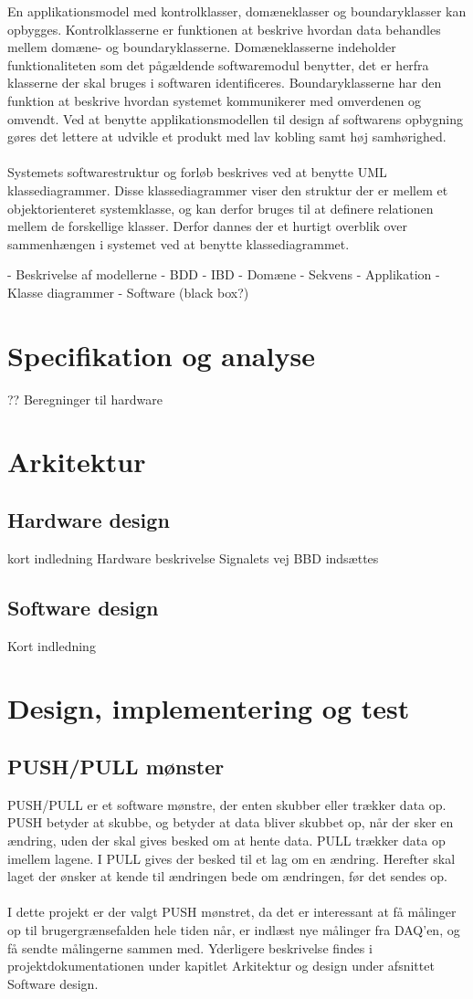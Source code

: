 En applikationsmodel med kontrolklasser, domæneklasser og boundaryklasser kan opbygges. Kontrolklasserne er funktionen at beskrive hvordan data behandles mellem domæne- og boundaryklasserne. Domæneklasserne indeholder funktionaliteten som det pågældende softwaremodul benytter, det er herfra klasserne der skal bruges i softwaren identificeres. Boundaryklasserne har den funktion at beskrive hvordan systemet kommunikerer med omverdenen og omvendt. Ved at benytte applikationsmodellen til design af softwarens opbygning gøres det lettere at udvikle et produkt med lav kobling samt høj samhørighed. \\
\\
Systemets softwarestruktur og forløb beskrives ved at benytte UML klassediagrammer. Disse klassediagrammer viser den struktur der er mellem et objektorienteret systemklasse, og kan derfor bruges til at definere relationen mellem de forskellige klasser. Derfor dannes der et hurtigt overblik over sammenhængen i systemet ved at benytte klassediagrammet.  

- Beskrivelse af modellerne
	- BDD
	- IBD
	- Domæne
	- Sekvens
	- Applikation
	- Klasse diagrammer
	- Software (black box?)

	
	\section{Specifikation og analyse}
	??
	Beregninger til hardware
	\section{Arkitektur}
	\subsection{Hardware design}
	kort indledning
	Hardware beskrivelse
	Signalets vej
	BBD indsættes
	\subsection{Software design}
	Kort indledning
	\section{Design, implementering og test}
\subsection{PUSH/PULL mønster}
PUSH/PULL er et software mønstre, der enten skubber eller trækker data op. PUSH betyder at skubbe, og betyder at data bliver skubbet op, når der sker en ændring, uden der skal gives besked om at hente data. PULL trækker data op imellem lagene. I PULL gives der besked til et lag om en ændring. Herefter skal laget der ønsker at kende til ændringen bede om ændringen, før det sendes op.\\
\\
I dette projekt er der valgt PUSH mønstret, da det er interessant at få målinger op til brugergrænsefalden hele tiden når, er indlæst nye målinger fra DAQ’en, og få sendte målingerne sammen med. Yderligere beskrivelse findes i projektdokumentationen under kapitlet Arkitektur og design under afsnittet Software design. 
